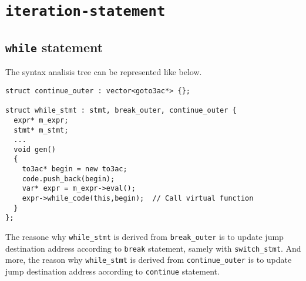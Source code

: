 \section{{\tt{iteration-statement}}}

\subsection{{\tt{while}} statement}
\label{stmt_e004}
The syntax analisis tree can be represented like below.
\begin{verbatim}
struct continue_outer : vector<goto3ac*> {};

struct while_stmt : stmt, break_outer, continue_outer {
  expr* m_expr;
  stmt* m_stmt;
  ...
  void gen()
  {
    to3ac* begin = new to3ac;
    code.push_back(begin);
    var* expr = m_expr->eval();
    expr->while_code(this,begin);  // Call virtual function
  }
};
\end{verbatim}
The reasone why {\tt{while\_stmt}} is derived from {\tt{break\_outer}}
is to update jump destination address according to {\tt{break}}
statement, samely with {\tt{switch\_stmt}}.
And more, the reason why
{\tt{while\_stmt}} is derived from {\tt{continue\_outer}}
is to update jump destination address according to {\tt{continue}}
statement.

